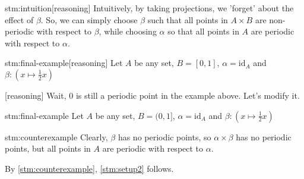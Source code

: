 \documentclass{article}
\begin{document}
\begin{stm}{stm:intuition}[reasoning]
Intuitively, by taking projections, we 'forget' about the effect of $\beta$. So, we can simply choose $\beta$ such that all points in $A \times B$ are non-periodic with respect to $\beta$, while choosing $\alpha$ so that all points in $A$ are periodic with respect to $\alpha$. 
\end{stm}

\begin{stm}{stm:final-example}[reasoning]
Let $A$ be any set, $B = [0,1]$, $\alpha = \mathrm{id}_A$ and $\beta: (x \mapsto \frac{1}{2}x)$
\end{stm}

\begin{stm}{}[reasoning]
Wait, $0$ is still a periodic point in the example above. Let's modify it.
\end{stm}

\begin{stm}{stm:final-example}
    Let $A$ be any set, $B = (0,1]$, $\alpha = \mathrm{id}_A$ and $\beta: (x \mapsto \frac{1}{2}x)$
\end{stm}
    
\begin{stm}{stm:counterexample}
Clearly, $\beta$ has no periodic points, so $\alpha \times \beta$ has no periodic points, but all points in $A$ are periodic with respect to $\alpha$. 
\end{stm}

\begin{stm}{}
By \ref{stm:counterexample}, \ref{stm:setup2} follows.
\end{stm}
\end{document}
